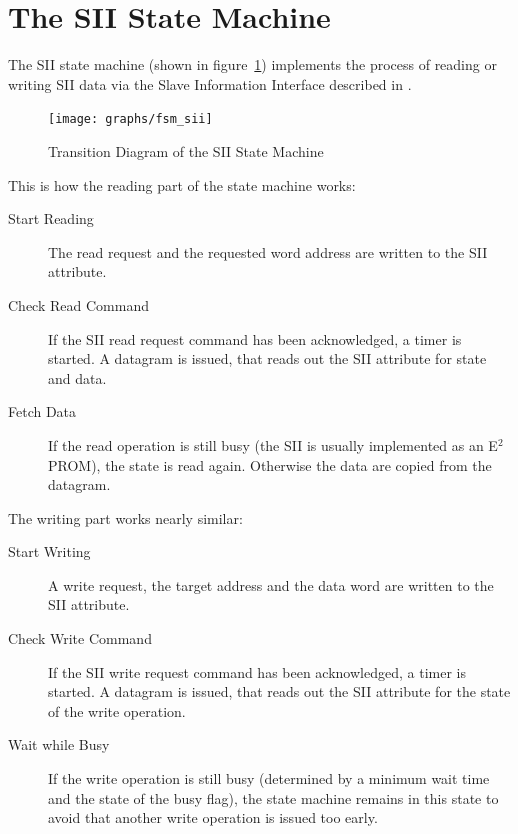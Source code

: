 \documentclass[a4paper,12pt,BCOR6mm,bibtotoc,idxtotoc]{scrbook}
\begin{document}
\section{The SII State Machine}
\label{sec:fsm-sii}

The SII state machine (shown in figure~\ref{fig:fsm-sii})
implements the process of reading or writing SII data via the Slave
Information Interface described in \cite[sec.~6.4]{dlspec}.

\begin{figure}[htbp]
  \centering
  \texttt{[image: graphs/fsm\_sii]}
  \caption{Transition Diagram of the SII State Machine}
  \label{fig:fsm-sii}
\end{figure}

This is how the reading part of the state machine works:

\begin{description}

\item[Start Reading] The read request and the requested word address are
written to the SII attribute.

\item[Check Read Command] If the SII read request command has been
acknowledged, a timer is started. A datagram is issued, that reads out the SII
attribute for state and data.

\item[Fetch Data] If the read operation is still busy (the SII is usually
implemented as an E$^2$PROM), the state is read again. Otherwise the data are
copied from the datagram.

\end{description}

The writing part works nearly similar:

\begin{description}

\item[Start Writing] A write request, the target address and the data word are
written to the SII attribute.

\item[Check Write Command] If the SII write request command has been
acknowledged, a timer is started. A datagram is issued, that reads out the SII
attribute for the state of the write operation.

\item[Wait while Busy] If the write operation is still busy (determined by a
minimum wait time and the state of the busy flag), the state machine remains in
this state to avoid that another write operation is issued too early.

\end{description}
\end{document}
